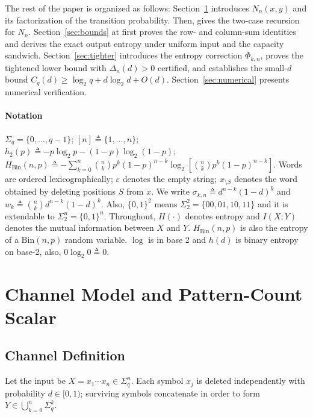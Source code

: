 \documentclass[conference]{IEEEtran}
\begin{document}
The rest of the paper is organized as follows: Section~\ref{sec:model} introduces $N_n(x,y)$ and its factorization
of the transition probability. Then, gives the
two-case recursion for $N_n$. Section~\ref{sec:bounds} at first proves the
row- and column-sum identities and derives the
exact output entropy under uniform input and the capacity sandwich.
Section~\ref{sec:tighter} introduces the entropy correction $\Phi_{k,n}$,
proves the tightened lower bound with $\Delta_n(d)>0$ certified, and
establishes the small-$d$ bound $C_q(d)\ge\log_2 q+d\log_2 d+O(d)$.
Section~\ref{sec:numerical} presents numerical verification.

\paragraph*{Notation}
$\Sigma_q=\{0,\ldots,q-1\}$; $[n]\triangleq \{1,\ldots,n\}$;
$h_2(p)\triangleq -p\log_2 p-(1-p)\log_2(1-p)$;
$H_{\mathrm{Bin}}(n,p)\triangleq -\sum_{k=0}^n\binom{n}{k}p^k(1-p)^{n-k}
\log_2[\binom{n}{k}p^k(1-p)^{n-k}]$.
Words are ordered lexicographically; $\varepsilon$ denotes the empty
string; $x_{\setminus S}$ denotes the word obtained by deleting
positions $S$ from $x$.  We write $\sigma_{k,n}\triangleq d^{n-k}(1-d)^k$ and
$w_k\triangleq \binom{n}{k}d^{n-k}(1-d)^k$. Also, $\{0,1\}^2$ means $\Sigma^2_2=\{00,01,10,11\}$ and it is extendable to $\Sigma^n_2=\{0,1\}^n$.
Throughout, $H(\cdot)$ denotes entropy and $I(X;Y)$ denotes the mutual information between $X$ and $Y$.
$H_{\mathrm{Bin}}(n,p)$ is also the entropy of a $\mathrm{Bin}(n,p)$ random variable. \(\log\) is in base 2 and \(h(d)\) is
binary entropy on base-2, also, $0\log_2 0\triangleq 0$.


\section{Channel Model and Pattern-Count Scalar}
\label{sec:model}

\subsection{Channel Definition}

Let the input be $X=x_1\cdots x_n\in\Sigma_q^n$.  Each symbol $x_j$
is deleted independently with probability $d\in[0,1)$; surviving
symbols concatenate in order to form $Y\in\bigcup_{k=0}^n\Sigma_q^k$.
\end{document}
